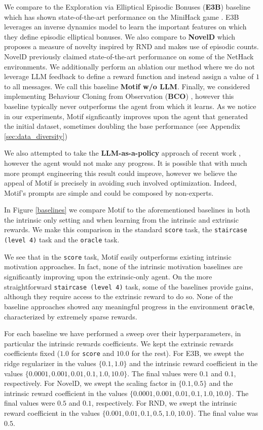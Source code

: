 \documentclass{article} %
\begin{document}
We compare to the Exploration via Elliptical Episodic Bonuses (\textbf{E3B}) baseline \citep{HenaffRJR22} which has shown state-of-the-art performance on the MiniHack game \citep{Samvelyan2021}. E3B leverages an inverse dynamics model to learn the important features on which they define episodic elliptical bonuses. We also compare to \textbf{NovelD} \citep{ZhangNeurips21} which proposes a measure of novelty inspired by RND and makes use of episodic counts. NovelD previously claimed state-of-the-art performance on some of the NetHack environments. We additionally perform an ablation our method where we do not leverage LLM feedback to define a reward function and instead assign a value of $1$ to all messages. We call this baseline \textbf{Motif w/o LLM}. Finally, we considered implementing Behaviour Cloning from Observation (\textbf{BCO}) \citep{DBLP:journals/corr/bco}, however this baseline typically never outperforms the agent from which it learns. As we notice in our experiments, Motif signficantly improves upon the  agent that generated the initial dataset, sometimes doubling the base performance (see Appendix \ref{sec:data_diversity})

We also attempted to take the \textbf{LLM-as-a-policy} approach of recent work \cite{wang2023voyager}, however the agent would not make any progress. It is possible that with much more prompt engineering this result could improve, however we believe the appeal of Motif is precisely in avoiding such involved optimization. Indeed, Motif's prompts are simple and could be composed by non-experts.

In Figure \ref{baselines} we compare Motif to the aforementioned baselines in both the intrinsic only setting and when learning from the intrinsic and extrinsic rewards. We make this comparison in the standard \texttt{score} task, the \texttt{staircase (level 4)} task and the \texttt{oracle} task. 

We see that in the \texttt{score} task, Motif easily outperforms existing intrinsic motivation approaches. In fact, none of the intrinsic motivation baselines are significantly improving upon the extrinsic-only agent. On the more straightforward \texttt{staircase (level 4)} task, some of the baselines provide gains, although they require access to the extrinsic reward to do so. None of the baseline approaches showed any meaningful progress in the environment \texttt{oracle}, characterized by extremely sparse rewards. 

For each baseline we have performed a sweep over their hyperparameters, in particular the intrinsic rewards coefficients. We kept the extrinsic rewards coefficients fixed ($1.0$ for \texttt{score} and $10.0$ for the rest). For E3B, we swept the ridge regularizer in the values $\{0.1, 1.0\}$ and the intrinsic reward coefficient in the values $\{0.0001, 0.001, 0.01, 0.1, 1.0, 10.0\}$. The final values were $0.1$ and $0.1$, respectively. For NovelD, we swept the scaling factor in $\{0.1, 0.5\}$ and the intrinsic reward coefficient in the values $\{0.0001, 0.001, 0.01, 0.1, 1.0, 10.0\}$. The final values were $0.5$ and $0.1$, respectively. For RND, we swept the intrinsic reward coefficient in the values $\{0.001, 0.01, 0.1, 0.5, 1.0, 10.0\}$. The final value was $0.5$.
\end{document}
